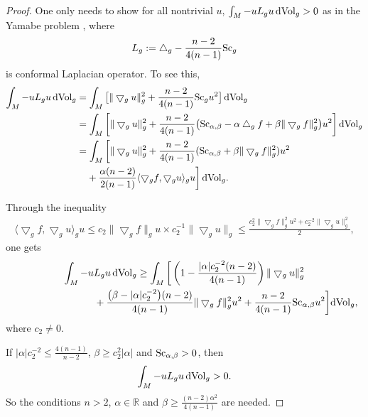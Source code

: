\documentclass[pdftex]{sigma}
\begin{document}
\begin{proof}One only needs to show for all nontrivial $u$, $\int_M - u L_gu \,{\rm dVol}_g > 0$ as in the Yamabe problem \cite{MR788292}, where
\begin{align*}
L_g: = \bigtriangleup_g - \frac{n-2}{4(n-1)}{\rm Sc}_g
\end{align*}
 is conformal Laplacian operator. To see this,
\begin{align*}
\int_M - u L_gu \,{\rm dVol}_g &= \int_M \big[ \|\bigtriangledown_gu\|_g^2 + \frac{n-2}{4(n-1)}{\rm Sc}_g u^2 \big] \,{\rm dVol}_g \\
& = \int_M \left[ \|\bigtriangledown_gu\|_g^2 + \frac{n-2}{4(n-1)}\big({\rm Sc}_{\alpha, \beta} - \alpha \bigtriangleup_gf + \beta\|\bigtriangledown_gf\|^2_g\big) u^2\right] {\rm dVol}_g \\
& = \int_M \left[ \|\bigtriangledown_gu\|_g^2 + \frac{n-2}{4(n-1)}({\rm Sc}_{\alpha, \beta} + \beta\|\bigtriangledown_gf\|^2_g)u^2\right.\\
&\left. \hphantom{=}{} + \frac{\alpha(n-2)}{2(n-1)} \langle\bigtriangledown_gf,\bigtriangledown_gu \rangle_g u \right] {\rm dVol}_g.
\end{align*}

Through the inequality
\begin{gather*}
 \langle\bigtriangledown_gf,\bigtriangledown_gu \rangle_g u \leq c_2 \|\bigtriangledown_gf\|_gu \times c_2^{-1} \|\bigtriangledown_gu\|_g \leq \frac{c_2^2 \|\bigtriangledown_gf\|_g^2 u^2 + c_2^{-2}\|\bigtriangledown_gu\|_g^2}{2},
\end{gather*}
one gets
\begin{gather*}
\int_M - u L_gu \,{\rm dVol}_g \geq
 \int_M \bigg[ \left(1- \frac{|\alpha|c_2^{-2}(n-2)}{4(n-1)}\right)\|\bigtriangledown_gu\|_g^2 \\
\hphantom{\int_M - u L_gu \,{\rm dVol}_g \geq}{}
+\frac{\big(\beta -|\alpha|c_2^{-2}\big)(n-2)}{4(n-1)}\|\bigtriangledown_gf\|_g^2u^2+ \frac{n-2}{4(n-1)}{\rm Sc}_{\alpha, \beta}u^2\bigg]{\rm dVol}_g,
\end{gather*}
where $c_2 \neq 0$.

If $ |\alpha|c_2^{-2} \leq \frac{4(n-1)}{n-2}$, $\beta \geq c_2^2|\alpha|$ and ${\rm Sc}_{\alpha, \beta}> 0$, then
\begin{align*}
 \int_M - u L_gu\, {\rm dVol}_g >0.
\end{align*}
 So the conditions $n>2$, $\alpha \in \mathbb{R}$ and $\beta \geq \frac{(n-2)\alpha^2}{4(n-1)}$ are needed.
\end{proof}
\end{document}
